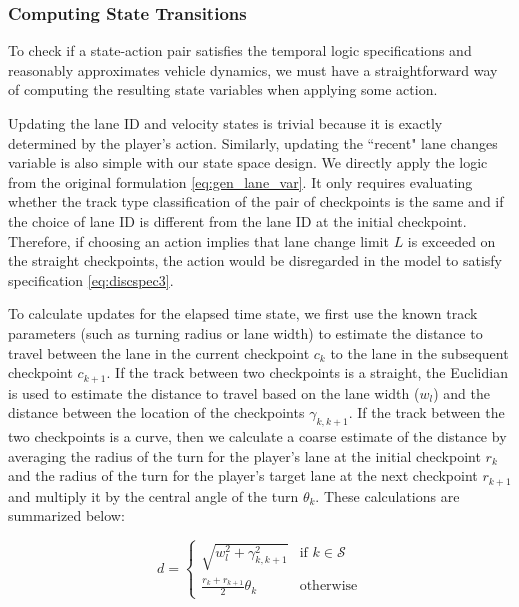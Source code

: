 \subsubsection{Computing State Transitions}
To check if a state-action pair satisfies the temporal logic specifications and reasonably approximates vehicle dynamics, we must have a straightforward way of computing the resulting state variables when applying some action. 

Updating the lane ID and velocity states is trivial because it is exactly determined by the player's action. Similarly, updating the ``recent" lane changes variable is also simple with our state space design. We directly apply the logic from the original formulation \eqref{eq:gen_lane_var}. It only requires evaluating whether the track type classification of the pair of checkpoints is the same and if the choice of lane ID is different from the lane ID at the initial checkpoint. Therefore, if choosing an action implies that lane change limit $L$ is exceeded on the straight checkpoints, the action would be disregarded in the model to satisfy specification \eqref{eq:discspec3}. 

To calculate updates for the elapsed time state, we first use the known track parameters (such as turning radius or lane width) to estimate the distance to travel between the lane in the current checkpoint $c_k$ to the lane in the subsequent checkpoint $c_{k+1}$. If the track between two checkpoints is a straight, the Euclidian is used to estimate the distance to travel based on the lane width ($w_l$) and the distance between the location of the checkpoints $\gamma_{k, k+1}$. If the track between the two checkpoints is a curve, then we calculate a coarse estimate of the distance by averaging the radius of the turn for the player's lane at the initial checkpoint $r_k$ and the radius of the turn for the player's target lane at the next checkpoint $r_{k+1}$ and multiply it by the central angle of the turn $\theta_k$. These calculations are summarized below:

\begin{equation} \label{eq:dist_calc}
    d = \begin{cases}
    \sqrt{w_l^2 + \gamma_{k, k+1}^2} &  \text{if } k \in \mathcal{S} \\
    \frac{r_k + r_{k+1}}{2}\theta_k & \text{otherwise}
    \end{cases}
\end{equation}

